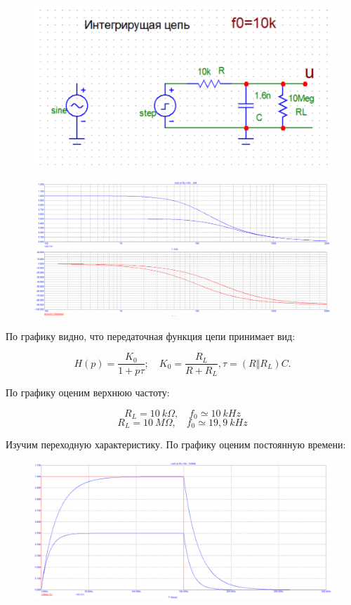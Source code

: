 \documentclass{article}
\begin{document}
\begin{figure}[H]
\centering
\includegraphics[scale=0.4]{rcint_img.png}
\label{fig:Image1}
\end{figure}

\begin{figure}[H]
\centering
\includegraphics[scale=0.4]{rcint_AC.png}
\label{fig:Image1}
\end{figure}

По графику видно, что передаточная функция цепи принимает вид:

\[H(p) = \frac{K_0}{1 + p\tau}; \quad K_0 = \frac{R_L}{R + R_L},\tau = (R\Vert R_L) C.\]

По графику оценим верхнюю частоту:

\[R_L = 10 \: k\Omega, \quad f_0 \simeq 10 \: kHz\]
\[R_L = 10 \: M\Omega, \quad f_0 \simeq 19,9 \: kHz\]

Изучим переходную характеристику. По графику оценим постоянную времени:

\begin{figure}[H]
\centering
\includegraphics[scale=0.4]{rcint_Transient.png}
\label{fig:Image1}
\end{figure}
\end{document}
